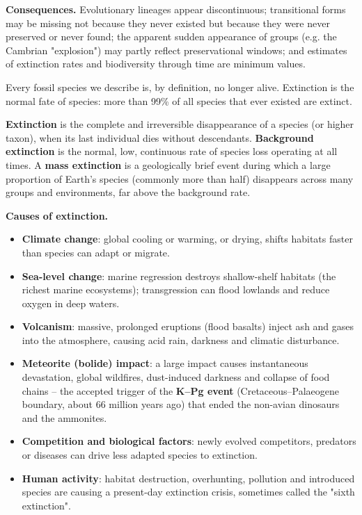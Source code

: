 \documentclass[11pt]{article}
\newcounter{popsec}
\newcounter{popsub}
\newcommand{\courssub}[1]{%
  \stepcounter{popsub}%
  \par\vspace{9pt}\noindent{\popxbold\fontsize{11.5}{13}\selectfont\color{popink}{\color{poporange}\thepopsec.\thepopsub}\hspace{6pt}#1}\par\nopagebreak\vspace{4pt}
}
\begin{document}
\textbf{Consequences.} Evolutionary lineages appear discontinuous; transitional forms may be missing not because they never existed but because they were never preserved or never found; the apparent sudden appearance of groups (e.g. the Cambrian "explosion") may partly reflect preservational windows; and estimates of extinction rates and biodiversity through time are minimum values.

\courssub{Extinction}

Every fossil species we describe is, by definition, no longer alive. Extinction is the normal fate of species: more than 99\% of all species that ever existed are extinct.

\begin{definition}
\textbf{Extinction} is the complete and irreversible disappearance of a species (or higher taxon), when its last individual dies without descendants. \textbf{Background extinction} is the normal, low, continuous rate of species loss operating at all times. A \textbf{mass extinction} is a geologically brief event during which a large proportion of Earth's species (commonly more than half) disappears across many groups and environments, far above the background rate.
\end{definition}

\textbf{Causes of extinction.}

\begin{itemize}
\item \textbf{Climate change}: global cooling or warming, or drying, shifts habitats faster than species can adapt or migrate.
\item \textbf{Sea-level change}: marine regression destroys shallow-shelf habitats (the richest marine ecosystems); transgression can flood lowlands and reduce oxygen in deep waters.
\item \textbf{Volcanism}: massive, prolonged eruptions (flood basalts) inject ash and gases into the atmosphere, causing acid rain, darkness and climatic disturbance.
\item \textbf{Meteorite (bolide) impact}: a large impact causes instantaneous devastation, global wildfires, dust-induced darkness and collapse of food chains -- the accepted trigger of the \textbf{K--Pg event} (Cretaceous--Palaeogene boundary, about 66 million years ago) that ended the non-avian dinosaurs and the ammonites.
\item \textbf{Competition and biological factors}: newly evolved competitors, predators or diseases can drive less adapted species to extinction.
\item \textbf{Human activity}: habitat destruction, overhunting, pollution and introduced species are causing a present-day extinction crisis, sometimes called the "sixth extinction".
\end{itemize}
\end{document}
